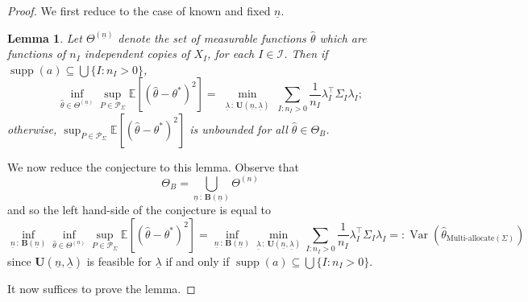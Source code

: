 \documentclass{article} %
\newcommand{\Ex}{\mathbb{E}}
\DeclareMathOperator{\Var}{Var}
\DeclareMathOperator{\supp}{supp}
\newtheorem{lemma}[lemma]{Lemma}
\begin{document}
\begin{proof}
    We first reduce to the case of known and fixed $\underline{n}$.
    \begin{lemma}\label{lemma:1}
        Let $\Theta^{(\underline{n})}$ denote the set of measurable functions $\hat{\theta}$ which are functions of $n_I$ independent copies of $X_I$, for each $I\in\mathcal{I}$. Then if $\supp(a)\subseteq\bigcup\{I:n_I>0\}$,
        \[
        \inf_{\hat{\theta}\in\Theta^{(\underline{n})}}\sup_{P\in\mathcal{P}_\Sigma} \Ex\left[(\hat{\theta}-\theta^*)^2\right] = \min_{\substack{\underline{\lambda}
\,:\,\mathbf{U}(\underline{n},\underline{\lambda})}} \sum_{I:n_I>0} \frac{1}{n_I}\lambda_I^\top \Sigma_I\lambda_I;
        \]
        otherwise, $\sup_{P\in\mathcal{P}_\Sigma} \Ex\left[(\hat{\theta}-\theta^*)^2\right]$ is unbounded for all $\hat{\theta}\in\Theta_B$.
    \end{lemma}

    We now reduce the conjecture to this lemma. Observe that
    \[
    \Theta_B = \bigcup_{\underline{n}\,:\,\mathbf{B}(\underline{n})} \Theta^{(n)}
    \]
    and so the left hand-side of the conjecture is equal to
    \[
    \inf_{\underline{n}\,:\,\mathbf{B}(\underline{n})} \inf_{\hat{\theta}\in\Theta^{(\underline{n})}}\sup_{P\in\mathcal{P}_\Sigma} \Ex\left[(\hat{\theta}-\theta^*)^2\right] = \inf_{\underline{n}\,:\,\mathbf{B}(\underline{n})} \min_{\underline{\lambda}\,:\,\mathbf{U}(\underline{n},\underline{\lambda})} \sum_{I:n_I>0} \frac{1}{n_I}\lambda_I^\top \Sigma_I\lambda_I =: \Var(\hat{\theta}_{\text{Multi-allocate$(\Sigma)$}})
    \]
    since $\mathbf{U}(\underline{n},\underline{\lambda})$ is feasible for $\underline{\lambda}$ if and only if $\supp(a)\subseteq \bigcup\{I:n_I>0\}$.
    
    It now suffices to prove the lemma.
\end{proof}
\end{document}
